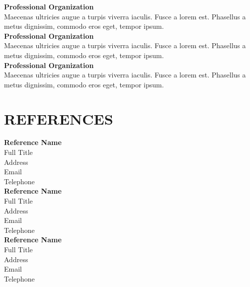 \documentclass[a4paper,9pt]{extarticle}
\begin{document}
\noindent
\newline
\textbf{Professional Organization} \\
Maecenas ultricies augue a turpis viverra iaculis. Fusce a lorem est. Phasellus a metus dignissim, commodo eros eget, tempor ipsum.  \\

\noindent
\textbf{Professional Organization} \\
Maecenas ultricies augue a turpis viverra iaculis. Fusce a lorem est. Phasellus a metus dignissim, commodo eros eget, tempor ipsum.  \\

\noindent
\textbf{Professional Organization} \\
Maecenas ultricies augue a turpis viverra iaculis. Fusce a lorem est. Phasellus a metus dignissim, commodo eros eget, tempor ipsum.  


\section*{REFERENCES}

\noindent
\newline
\textbf{Reference Name} \\
Full Title \\
Address\\
Email \\
Telephone \\

\noindent
\textbf{Reference Name} \\
Full Title \\
Address\\
Email \\
Telephone \\

\noindent
\textbf{Reference Name} \\
Full Title \\
Address\\
Email \\
Telephone \\


\end{document}
